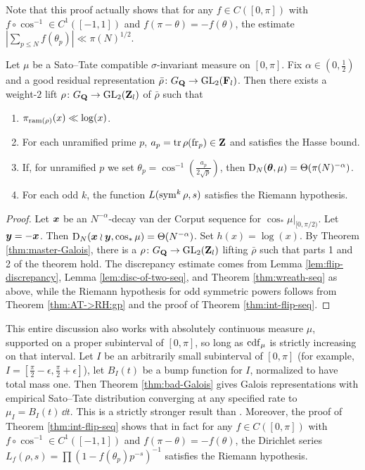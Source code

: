 Note that this proof actually shows that for any $f\in C([0,\pi])$ with 
$f\circ \cos^{-1}\in C^1([-1,1])$ and $f(\pi-\theta) = -f(\theta)$, the 
estimate $\left| \sum_{p\leqslant N} f(\theta_p)\right| \ll \pi(N)^{1/2}$. 

\begin{theorem}\label{thm:bad-Galois}
Let $\mu$ be a Sato--Tate compatible $\sigma$-invariant measure on $[0,\pi]$. 
Fix $\alpha\in \left(0,\frac 1 2\right)$ and a good residual representation 
$\bar\rho\colon G_{\mathbf{Q}} \to \operatorname{GL}_2(\mathbf{F}_l)$. Then there exists a weight-$2$ lift 
$\rho\colon G_{\mathbf{Q}} \to \operatorname{GL}_2(\mathbf{Z}_l)$ of $\bar\rho$ such that 
\begin{enumerate}
\item
$\pi_{\mathrm{ram}(\rho)}(x) \ll \log(x)$. 

\item
For each unramified prime $p$, $a_p = \operatorname{tr}\rho(\mathrm{fr}_p)\in \mathbf{Z}$ and satisfies 
the Hasse bound. 

\item
If, for unramified $p$ we set 
$\theta_p = \cos^{-1}\left(\frac{a_p}{2\sqrt p}\right)$, then 
$\operatorname{D}_N({\boldsymbol\theta},\mu) = \Theta(\pi(N)^{-\alpha})$. 

\item
For each odd $k$, the function $L(\operatorname{sym}^k \rho,s)$ satisfies the Riemann 
hypothesis. 
\end{enumerate}
\end{theorem}
\begin{proof}
Let ${\boldsymbol x}$ be an $N^{-\alpha}$-decay van der Corput sequence for 
$\cos_\ast \left.\mu\right|_{[0,\pi/2)}$. Let ${\boldsymbol y} = -{\boldsymbol x}$. Then 
$\operatorname{D}_N({\boldsymbol x}\wr{\boldsymbol y},\cos_\ast\mu) = \Theta(N^{-\alpha})$. Set $h(x) = \log(x)$. 
By Theorem \ref{thm:master-Galois}, there is a 
$\rho\colon G_{\mathbf{Q}} \to \operatorname{GL}_2(\mathbf{Z}_l)$ lifting $\bar\rho$ such that parts 
1 and 2 of the theorem hold. The discrepancy estimate comes from Lemma 
\ref{lem:flip-discrepancy}, Lemma \ref{lem:disc-of-two-seq}, and Theorem 
\ref{thm:wreath-seq} as above, while the Riemann hypothesis for odd symmetric 
powers follows from Theorem \ref{thm:AT->RH:gp} and the proof of Theorem 
\ref{thm:int-flip-seq}. 
\end{proof}

This entire discussion also works with absolutely continuous measure $\mu$, 
supported on a proper subinterval of $[0,\pi]$, so long as $\operatorname{cdf}_\mu$ is 
strictly increasing on that interval. Let $I$ be an arbitrarily small 
subinterval of $[0,\pi]$ (for example, 
$I = \left[\frac \pi 2 - \epsilon,\frac \pi 2 + \epsilon\right]$), let $B_I(t)$ 
be a bump function for $I$, normalized to have total mass one. Then Theorem 
\ref{thm:bad-Galois} gives Galois representations with empirical Sato--Tate 
distribution converging at any specified rate to $\mu_I = B_I(t)\, \dd t$. This 
is a strictly stronger result than \cite[Th.~5.2]{pande-2011}. Moreover, the 
proof of Theorem \ref{thm:int-flip-seq} shows that in fact for any 
$f\in C([0,\pi])$ with $f\circ \cos^{-1}\in C^1([-1,1])$ and 
$f(\pi-\theta) = -f(\theta)$, the Dirichlet series 
$L_f(\rho,s) = \prod \left( 1 - f(\theta_p) p^{-s}\right)^{-1}$ satisfies the 
Riemann hypothesis. 
